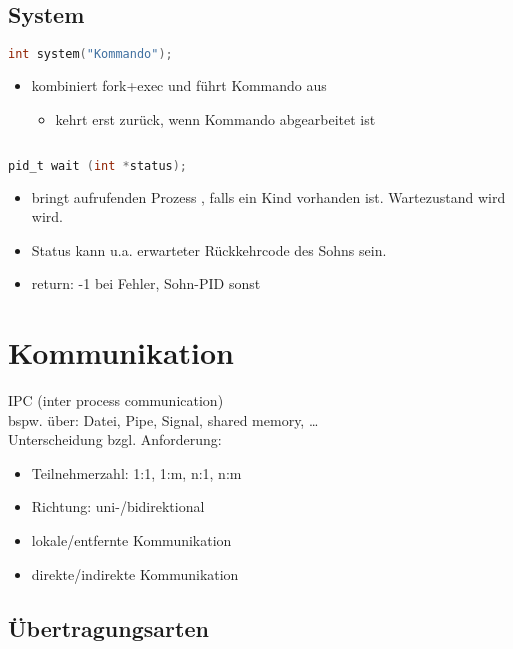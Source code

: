 \subsection{System}
\begin{lstlisting}[language=C]
int system("Kommando");
\end{lstlisting}
\begin{itemize}
\item kombiniert fork+exec und führt Kommando aus
\begin{itemize}[label=$\to$]
\item kehrt erst zurück, wenn Kommando abgearbeitet ist
\end{itemize}
\end{itemize}
\subsection[Wait]{}
\begin{lstlisting}[language=C]
pid_t wait (int *status);
\end{lstlisting}
\begin{itemize}
\item bringt aufrufenden Prozess , falls ein Kind vorhanden ist. Wartezustand wird  wird.
\item Status kann u.a. erwarteter Rückkehrcode des Sohns sein.
\item return: -1 bei Fehler, Sohn-PID sonst
\end{itemize}
\section{Kommunikation}
IPC (inter process communication)\\
bspw. über: Datei, Pipe, Signal, shared memory, …\\
Unterscheidung bzgl. Anforderung:
\begin{itemize}
\item Teilnehmerzahl: 1:1, 1:m, n:1, n:m
\item Richtung: uni-/bidirektional
\item lokale/entfernte Kommunikation
\item direkte/indirekte Kommunikation
\end{itemize}
\subsection{Übertragungsarten}
